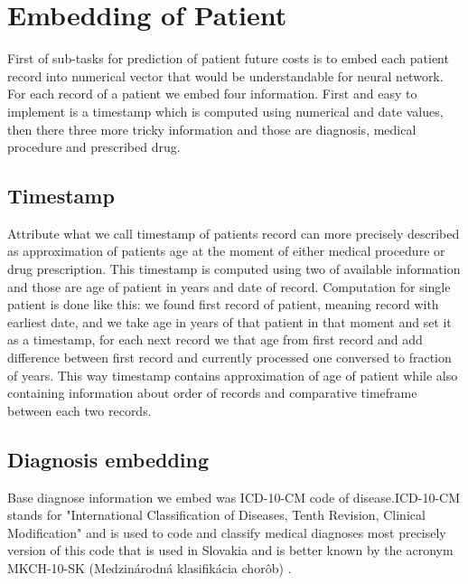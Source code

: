 
\section{Embedding of Patient}
\label{embedding}

First of sub-tasks for prediction of patient future costs is to embed each patient record into numerical vector that would be understandable for neural network. For each record of a patient we embed four information. First and easy to implement is a timestamp which is computed using numerical and date values, then there three more tricky information and those are diagnosis, medical procedure and prescribed drug. 

\subsection{Timestamp}

Attribute what we call timestamp of patients record can more precisely described as approximation of patients age at the moment of either medical procedure or drug prescription. This timestamp is computed using two of available information and those are age of patient in years and date of record. Computation for single patient is done like this: we found first record of patient, meaning record with earliest date, and we take age in years of that patient in that moment and set it as a timestamp, for each next record we that age from first record and add difference between first record and currently processed one conversed to fraction of years. This way timestamp contains approximation of age of patient while also containing information about order of records and comparative timeframe between each two records.

\subsection{Diagnosis embedding}
\label{diagEmb}

Base diagnose information we embed was ICD-10-CM code of disease.ICD-10-CM stands for "International Classification of Diseases, Tenth Revision, Clinical Modification" and is used to code and classify medical diagnoses \cite{cdcICD10CM} most precisely version of this code that is used in Slovakia and is better known by the acronym MKCH-10-SK (Medzinárodná klasifikácia chorôb) \cite{ncziMKCH}.\\

